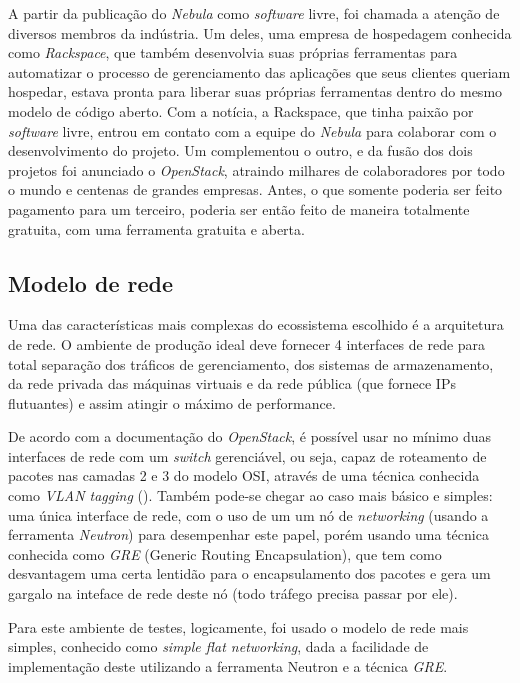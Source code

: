 A partir da publicação do \emph{Nebula} como \emph{software} livre, foi chamada
a atenção de diversos membros da indústria. Um deles, uma empresa de hospedagem
conhecida como \emph{Rackspace}, que também desenvolvia suas próprias
ferramentas para automatizar o processo de gerenciamento das aplicações
que seus clientes queriam hospedar, estava pronta para liberar suas próprias
ferramentas dentro do mesmo modelo de código aberto. Com a notícia, a Rackspace,
que tinha paixão por \emph{software} livre, entrou em contato com a equipe do \emph{Nebula}
para colaborar com o desenvolvimento do projeto. Um complementou o outro, e da
fusão dos dois projetos foi anunciado o \emph{OpenStack}, atraindo milhares de
colaboradores por todo o mundo e centenas de grandes empresas. Antes, o que
somente poderia ser feito pagamento para um terceiro, poderia ser então
feito de maneira totalmente gratuita, com uma ferramenta gratuita e aberta.

\subsection{Modelo de rede}

Uma das características mais complexas do ecossistema escolhido é a arquitetura
de rede. O ambiente de produção ideal deve fornecer 4 interfaces de rede para
total separação dos tráficos de gerenciamento, dos sistemas de armazenamento,
da rede privada das máquinas virtuais e da rede pública (que fornece IPs
flutuantes) e assim atingir o máximo de performance.

De acordo com a documentação do \emph{OpenStack}, é possível usar no mínimo duas interfaces de rede
com um \emph{switch} gerenciável, ou seja, capaz de roteamento de pacotes nas camadas 2 e 3
do modelo OSI, através de uma técnica conhecida como \emph{VLAN tagging} (\cite{l2-l3-vlan}). Também pode-se
chegar ao caso mais básico e simples: uma única interface de rede,
com o uso de um um nó de \emph{networking} (usando a ferramenta \emph{Neutron})
para desempenhar este papel, porém usando uma técnica conhecida como \emph{GRE} (Generic
Routing Encapsulation), que tem como desvantagem uma certa lentidão
para o encapsulamento dos pacotes e gera um gargalo na inteface de rede deste
nó (todo tráfego precisa passar por ele).

Para este ambiente de testes, logicamente, foi usado o modelo de rede mais
simples, conhecido como \emph{simple flat networking}, dada a facilidade
de implementação deste utilizando a ferramenta Neutron e a técnica \emph{GRE}.

